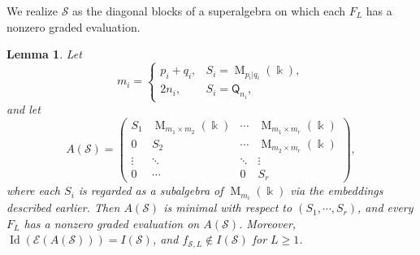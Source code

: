\documentclass[11pt,reqno]{amsart}
\newcommand{\kk}{\Bbbk}
\newcommand{\E}{\mathcal E}
\newcommand{\Id}{\operatorname{Id}}
\newcommand{\Mat}{\operatorname{M}}
\newcommand{\Qtype}{\mathsf Q}
\newtheorem{lemma}[theorem]{Lemma}
\theoremstyle{definition}
\theoremstyle{remark}
\numberwithin{equation}{section}
\begin{document}





We realize $\mathcal S$ as the diagonal blocks of a superalgebra
on which each $F_L$ has a nonzero graded evaluation.


\begin{lemma}\label{lem:target-evaluation}
Let
\[
m_i=
\begin{cases}
p_i+q_i, & S_i=\Mat_{p_i|q_i}(\kk),\\
2n_i,   & S_i=\Qtype_{n_i},
\end{cases}
\]
and let
\[
A(\mathcal S)=
\begin{pmatrix}
S_1 & \Mat_{m_1\times m_2}(\kk) & \cdots
    & \Mat_{m_1\times m_r}(\kk)\\
0   & S_2 & \cdots & \Mat_{m_2\times m_r}(\kk)\\
\vdots & \ddots & \ddots & \vdots\\
0 & \cdots & 0 & S_r
\end{pmatrix},
\]
where each $S_i$ is regarded as a subalgebra of
$\Mat_{m_i}(\kk)$ via the embeddings described earlier.
Then $A(\mathcal S)$ is minimal with respect to
$(S_1,\cdots,S_r)$, and every $F_L$ has a nonzero graded
evaluation on $A(\mathcal S)$.
 Moreover, $
\Id(\E(A(\mathcal S)))=I(\mathcal S)$, and $ f_{\mathcal S,L}\notin I(\mathcal S)$ for $L\geq1$.

\end{lemma}
\end{document}
